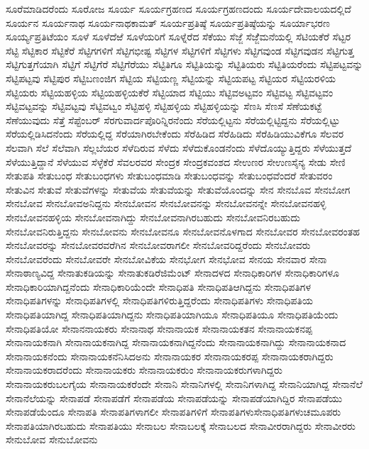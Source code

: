 {ಸೂರೆಮಾಡಿದರೆಂದು
ಸೂರೋಜ
ಸೂರ್ಯ
ಸೂರ್ಯಗ್ರಹಣದ
ಸೂರ್ಯಗ್ರಹಣದಂದು
ಸೂರ್ಯದೇವಾಲಯದಲ್ಲಿದೆ
ಸೂರ್ಯನ
ಸೂರ್ಯನಾಥ
ಸೂರ್ಯನಾಥಕಾಮತ್
ಸೂರ್ಯಪ್ರತಿಷ್ಠೆ
ಸೂರ್ಯಪ್ರತಿಷ್ಠೆಯನ್ನು
ಸೂರ್ಯಾಭರಣ
ಸೂರ್ಯ್ಯಪ್ರತಿಟೆಯಂ
ಸೂಳೆ
ಸೂಳೆದೆಱೆ
ಸೂಳೆಯರಿಗೆ
ಸೂಳ್ನೆರೆದ
ಸೆಕೆಯು
ಸೆಜ್ಜೆ
ಸೆಜ್ಜೆೆಮನೆಯಲ್ಲಿ
ಸೆಟಿಯಕೆರೆ
ಸೆಟ್ಟರ
ಸೆಟ್ಟಿ
ಸೆಟ್ಟಿಕಾರ
ಸೆಟ್ಟಿಕೆರೆ
ಸೆಟ್ಟಿಗಗಳಿಗೆ
ಸೆಟ್ಟಿಗಭೀಷ್ಟ
ಸೆಟ್ಟಿಗಳ
ಸೆಟ್ಟಿಗಳಿಗೆ
ಸೆಟ್ಟಿಗಳು
ಸೆಟ್ಟಿಗವುಂಡ
ಸೆಟ್ಟಿಗವುಡನ
ಸೆಟ್ಟಿಗುತ್ತ
ಸೆಟ್ಟಿಗುತ್ತಗೆಯಾಗಿ
ಸೆಟ್ಟಿಗೆ
ಸೆಟ್ಟಿಗೆರೆ
ಸೆಟ್ಟಿಗೆರೆಯು
ಸೆಟ್ಟಿತಿಗೂ
ಸೆಟ್ಟಿತಿಯನ್ನು
ಸೆಟ್ಟಿತಿಯರು
ಸೆಟ್ಟಿತಿಯರೆಂದು
ಸೆಟ್ಟಿಪಟ್ಟವನ್ನು
ಸೆಟ್ಟಿಪಟ್ಟವು
ಸೆಟ್ಟಿಪುರ
ಸೆಟ್ಟಿಬಣಂಜಿಗ
ಸೆಟ್ಟಿಯ
ಸೆಟ್ಟಿಯಣ್ಣ
ಸೆಟ್ಟಿಯನ್ನು
ಸೆಟ್ಟಿಯಪಟ್ಟ
ಸೆಟ್ಟಿಯರ
ಸೆಟ್ಟಿಯರಳಿಯ
ಸೆಟ್ಟಿಯರು
ಸೆಟ್ಟಿಯಹಳ್ಳಿಯ
ಸೆಟ್ಟಿಯಹಳ್ಳಿಯಕೆರೆ
ಸೆಟ್ಟಿಯಾದ
ಸೆಟ್ಟಿಯು
ಸೆಟ್ಟಿವಅಟ್ಟವಂ
ಸೆಟ್ಟಿವಟ್ಟ
ಸೆಟ್ಟಿವಟ್ಟವಂ
ಸೆಟ್ಟಿವಟ್ಟವನ್ನು
ಸೆಟ್ಟಿವಟ್ಟವು
ಸೆಟ್ಟಿವಟ್ವಂ
ಸೆಟ್ಟಿಹಳ್ಳಿ
ಸೆಟ್ಟಿಹಳ್ಳಿಯ
ಸೆಟ್ಟಿಹಳ್ಳಿಯನ್ನು
ಸೆಣಸಿ
ಸೆಣಸೆ
ಸೆಣೆಯಕಟ್ಟೆ
ಸೆಣೆಯುವುದು
ಸೆತ್ತೆ
ಸೆಪ್ಟೆಂಬರ್
ಸೆರಗುವಾರ್ದಪೊರಿನ್ನಿರನೆಂದು
ಸೆರೆಯಲ್ಲಿಟ್ಟನು
ಸೆರೆಯಲ್ಲಿಟ್ಟಿದ್ದನು
ಸೆರೆಯಲ್ಲಿಟ್ಟು
ಸೆರೆಯಲ್ಲಿಡಿಸಿದನೆಂದು
ಸೆರೆಯಲ್ಲಿದ್ದ
ಸೆರೆಯಾಗಿರಬೇಕೆಂದು
ಸೆರೆಹಿಡಿದ
ಸೆರೆಹಿಡಿದು
ಸೆರೆಹಿಡಿಯುವಿಕೆಗೂ
ಸೆಲವರ
ಸೆಲವಾಗಿ
ಸೆಲೆ
ಸೆಲೆವಾಗಿ
ಸೆಲ್ಲಬೆಯರ
ಸೆಳೆದಿರುವ
ಸೆಳೆದು
ಸೆಳೆದುಕೊಂಡನೆಂದು
ಸೆಳೆದೊಯ್ಯುತ್ತಿದ್ದರು
ಸೆಳೆಯುತ್ತದೆ
ಸೆಳೆಯುತ್ತಿದ್ದಾನೆ
ಸೆಳೆಯುವ
ಸೆಳ್ಳೆಕೆರೆ
ಸೆವಲರವರ
ಸೇಂದ್ರಕ
ಸೇಂದ್ರಕವಂಶದ
ಸೇಉಣರ
ಸೇಉಣಸೈನ್ಯ
ಸೇಡು
ಸೇಣಿ
ಸೇತುಪತಿ
ಸೇತುಬಂಧ
ಸೇತುಬಂಧಗಳು
ಸೇತುಬಂಧಮಾಡಿ
ಸೇತುಬಂಧವನ್ನು
ಸೇತುಬಂಧವೆಂದರೆ
ಸೇತುವರಂ
ಸೇತುವಿನ
ಸೇತುವೆ
ಸೇತುವೆಗಳನ್ನು
ಸೇತುವೆಯ
ಸೇತುವೆಯನ್ನು
ಸೇತುವೆಯೊಂದನ್ನು
ಸೇನ
ಸೇನಬೊವ
ಸೇನಬೋಗ
ಸೇನಬೋವ
ಸೇನಬೋವಅನಿದ್ದನು
ಸೇನಬೋವನ
ಸೇನಬೋವನನ್ನು
ಸೇನಬೋವನನ್ನೇ
ಸೇನಬೋವನಹಳ್ಳಿ
ಸೇನಬೋವನಹಳ್ಳಿಯ
ಸೇನಬೋವನಾಗಿದ್ದು
ಸೇನಬೋವನಾಗಿರಬಹುದು
ಸೇನಬೋವನಿರಬಹುದು
ಸೇನಬೋವನಿರುತ್ತಿದ್ದನು
ಸೇನಬೋವನು
ಸೇನಬೋವನೂ
ಸೇನಬೋವನೊಳಗಾದ
ಸೇನಬೋವರ
ಸೇನಬೋವರಂತಹ
ಸೇನಬೋವರನ್ನು
ಸೇನಬೋವರವರೆಗಿನ
ಸೇನಬೋವರಾಗಲೀ
ಸೇನಬೋವರಿದ್ದರೆಂದು
ಸೇನಬೋವರು
ಸೇನಬೋವರೆಂದು
ಸೇನಬೋವರೇ
ಸೇನಬೋವಿಕೆಯ
ಸೇನಭೋಗ
ಸೇನಭೋವ
ಸೇನಯ
ಸೇನವಾರ
ಸೇನಾ
ಸೇನಾಠಾಣ್ಯವಿದ್ದ
ಸೇನಾತುಕಡಿಯನ್ನು
ಸೇನಾತುಕಡಿರೆಜಿಮೆಂಟ್
ಸೇನಾದಳದ
ಸೇನಾಧಿಕಾರಿಗಳ
ಸೇನಾಧಿಕಾರಿಗಳೂ
ಸೇನಾಧಿಕಾರಿಯಾಗಿದ್ದನೆಂದು
ಸೇನಾಧಿಕಾರಿಯೆಂದೇ
ಸೇನಾಧಿಪತಿ
ಸೇನಾಧಿಪತಿಆಗಿದ್ದನು
ಸೇನಾಧಿಪತಿಗಳ
ಸೇನಾಧಿಪತಿಗಳನ್ನು
ಸೇನಾಧಿಪತಿಗಳಲ್ಲಿ
ಸೇನಾಧಿಪತಿಗಳಿರುತ್ತಿದ್ದರೆಂದು
ಸೇನಾಧಿಪತಿಗಳು
ಸೇನಾಧಿಪತಿಯ
ಸೇನಾಧಿಪತಿಯಾಗಿದ್ದ
ಸೇನಾಧಿಪತಿಯಾಗಿದ್ದನು
ಸೇನಾಧಿಪತಿಯಾಗಿಯೂ
ಸೇನಾಧಿಪತಿಯೂ
ಸೇನಾಧಿಪತಿಯೆಂದು
ಸೇನಾಧಿಪತಿಯೋ
ಸೇನಾನನಾಯಕರು
ಸೇನಾನಾಥ
ಸೇನಾನಾಯಕ
ಸೇನಾನಾಯಕತನ
ಸೇನಾನಾಯಕನಪ್ಪ
ಸೇನಾನಾಯಕನಾಗಿ
ಸೇನಾನಾಯಕನಾಗಿದ್ದ
ಸೇನಾನಾಯಕನಾಗಿದ್ದನೆಂದು
ಸೇನಾನಾಯಕನಾಗಿದ್ದು
ಸೇನಾನಾಯಕನಾದ
ಸೇನಾನಾಯಕನೆಂದು
ಸೇನಾನಾಯಕನೆನಿಸಿದಅನು
ಸೇನಾನಾಯಕರ
ಸೇನಾನಾಯಕರಪ್ಪ
ಸೇನಾನಾಯಕರಾಗಿದ್ದರು
ಸೇನಾನಾಯಕರಾದರೆಂದು
ಸೇನಾನಾಯಕರು
ಸೇನಾನಾಯಕರುಂ
ಸೇನಾನಾಯಕರುಗಳಾಗಿದ್ದರು
ಸೇನಾನಾಯಕರುಬಲಗೈಯ
ಸೇನಾನಾಯಕರೆಂದೇ
ಸೇನಾನಿ
ಸೇನಾನಿಗಳಲ್ಲಿ
ಸೇನಾನಿಗಳಾಗಿದ್ದ
ಸೇನಾನಿಯಾಗಿದ್ದ
ಸೇನಾನೆಲೆ
ಸೇನಾನೆಲೆಯನ್ನು
ಸೇನಾಪಡೆ
ಸೇನಾಪಡೆಗೆ
ಸೇನಾಪಡೆಯ
ಸೇನಾಪಡೆಯನ್ನು
ಸೇನಾಪಡೆಯಾಗಿದ್ದಿರ
ಸೇನಾಪಡೆಯು
ಸೇನಾಪಡೆಯೆಂದೂ
ಸೇನಾಪತಿ
ಸೇನಾಪತಿಗಳಾಗಲೀ
ಸೇನಾಪತಿಗಳಿಗೆ
ಸೇನಾಪತಿಗಳುಸೇನಾಧಿಪತಿಗಳುಚಮೂಪರು
ಸೇನಾಪತಿಯಾಗಿರಬಹುದು
ಸೇನಾಪತಿಯು
ಸೇನಾಬಲ
ಸೇನಾಬಲಕ್ಕೆ
ಸೇನಾಬಲದ
ಸೇನಾವೀರರಾಗಿದ್ದರು
ಸೇನಾವೀರರು
ಸೇನುಬೋವ
ಸೇನುಬೋವನು
}
